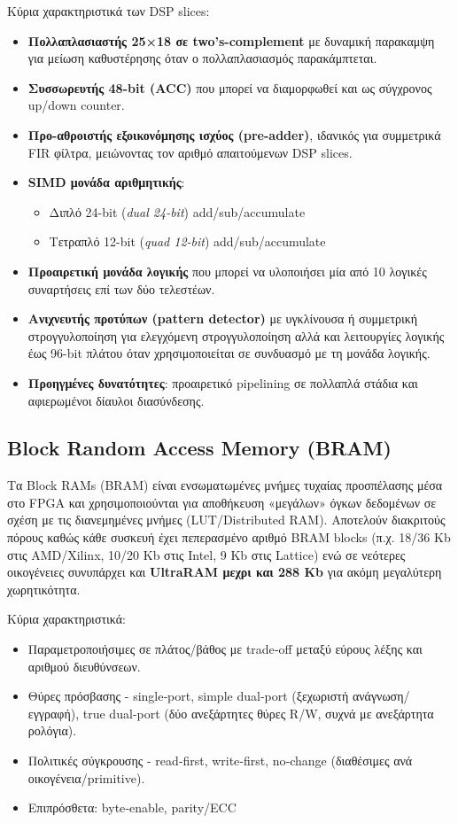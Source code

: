 Κύρια χαρακτηριστικά των DSP slices:
\begin{itemize}
  \item \textbf{Πολλαπλασιαστής 25×18 σε two’s-complement} με δυναμική παρακαμψη για μείωση καθυστέρησης όταν ο πολλαπλασιασμός παρακάμπτεται.
  \item \textbf{Συσσωρευτής 48-bit (ACC)} που μπορεί να διαμορφωθεί και ως σύγχρονος up/down counter.
  \item \textbf{Προ-αθροιστής εξοικονόμησης ισχύος (pre-adder)}, ιδανικός για συμμετρικά FIR φίλτρα, μειώνοντας τον αριθμό απαιτούμενων DSP slices.
  \item \textbf{SIMD μονάδα αριθμητικής}:
    \begin{itemize}
      \item Διπλό 24-bit (\emph{dual 24-bit}) add/sub/accumulate
      \item Τετραπλό 12-bit (\emph{quad 12-bit}) add/sub/accumulate
    \end{itemize}
  \item \textbf{Προαιρετική μονάδα λογικής} που μπορεί να υλοποιήσει μία από 10 λογικές συναρτήσεις επί των δύο τελεστέων.
  \item \textbf{Ανιχνευτής προτύπων (pattern detector)} με υγκλίνουσα ή συμμετρική στρογγυλοποίηση για ελεγχόμενη στρογγυλοποίηση
  αλλά και λειτουργίες λογικής έως 96-bit πλάτου όταν χρησιμοποιείται σε συνδυασμό με τη μονάδα λογικής.
  \item \textbf{Προηγμένες δυνατότητες}: προαιρετικό pipelining σε πολλαπλά στάδια και αφιερωμένοι δίαυλοι διασύνδεσης.
\end{itemize}

\subsection{Block Random Access Memory (BRAM)}
Τα Block RAMs (BRAM) είναι ενσωματωμένες μνήμες τυχαίας προσπέλασης μέσα στο FPGA και χρησιμοποιούνται για αποθήκευση «μεγάλων» όγκων δεδομένων
σε σχέση με τις διανεμημένες μνήμες (LUT/Distributed RAM).
Αποτελούν διακριτούς πόρους καθώς κάθε συσκευή έχει πεπερασμένο αριθμό BRAM blocks (π.χ. 18/36 Kb στις AMD/Xilinx, 10/20 Kb στις Intel, 9 Kb στις Lattice)
ενώ σε νεότερες οικογένειες συνυπάρχει και \textbf{UltraRAM μεχρι και 288 Kb} για ακόμη μεγαλύτερη χωρητικότητα.

Κύρια χαρακτηριστικά:
\begin{itemize}
  \item Παραμετροποιήσιμες σε πλάτος/βάθος με trade‑off μεταξύ εύρους λέξης και αριθμού διευθύνσεων.
  \item Θύρες πρόσβασης - single‑port, simple dual‑port (ξεχωριστή ανάγνωση/εγγραφή), true dual‑port (δύο ανεξάρτητες θύρες R/W, συχνά με ανεξάρτητα ρολόγια).
  \item Πολιτικές σύγκρουσης - read‑first, write‑first, no‑change (διαθέσιμες ανά οικογένεια/primitive).
  \item Επιπρόσθετα: byte‑enable, parity/ECC
\end{itemize}

